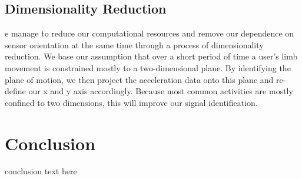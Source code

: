 \documentclass[journal]{IEEEtran}
\begin{document}
\subsection{Dimensionality Reduction}
e manage to reduce our computational resources and remove our dependence on sensor orientation at the same time through a process of dimensionality reduction. We base our assumption that over a short period of time a user’s limb movement is constrained mostly to a two-dimensional plane. By identifying the plane of motion, we then project the acceleration data onto this plane and re-define our x and y axis accordingly. Because most common activities are mostly confined to two dimensions, this will improve our signal identification.
\cite{bgk}
%
\section{Conclusion}
conclusion text here
%
\appendices
%
\ifCLASSOPTIONcaptionsoff
  \newpage
\fi
%


\end{document}
